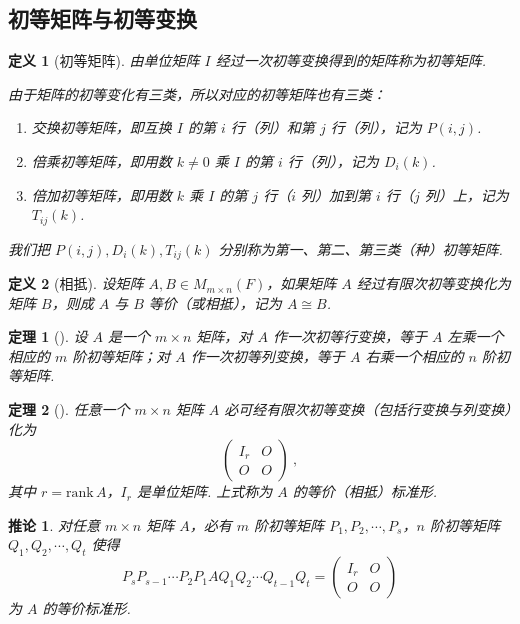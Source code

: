\documentclass[zihao=-4,UTF8,linespread=1.8,nothm]{aytony_base}
\newtheorem{theorem}{\indent 定理}[subsection]
\newtheorem*{corollary}{\indent 推论}
\newtheorem{definition}{\indent 定义}[subsection]
\begin{document}
\subsection{初等矩阵与初等变换}

\begin{definition}[初等矩阵]
    由单位矩阵 $I$ 经过一次初等变换得到的矩阵称为初等矩阵.

    由于矩阵的初等变化有三类，所以对应的初等矩阵也有三类：

    \begin{enumerate}[nosep]
        \item 交换初等矩阵，即互换 $I$ 的第 $i$ 行（列）和第 $j$ 行（列），记为 $
                  P(i,j)$.
        \item 倍乘初等矩阵，即用数 $k \neq 0$ 乘 $I$ 的第 $i$ 行（列），记为 $D_i(k)$.
        \item 倍加初等矩阵，即用数 $k$ 乘 $I$ 的第 $j$ 行（$i$ 列）加到第 $i$ 行（$j$ 列）上，记为 $T_{ij}(k)$.
    \end{enumerate}
    我们把 $P(i, j), D_i(k), T_{ij}(k)$ 分别称为第一、第二、第三类（种）初等矩阵.
\end{definition}

\begin{definition}[相抵]
    设矩阵 $A, B \in M_{m \times n}(F)$，如果矩阵 $A$ 经过有限次初等变换化为矩阵 $B$，则成 $A$ 与 $B$ 等价（或相抵），记为 $A \cong B$.
\end{definition}

\begin{theorem}[]
    设 $A$ 是一个 $m \times n$ 矩阵，对 $A$ 作一次初等行变换，等于 $A$ 左乘一个相应的 $m$ 阶初等矩阵；对 $A$ 作一次初等列变换，等于 $A$ 右乘一个相应的 $n$ 阶初等矩阵.
\end{theorem}

\begin{theorem}[]
    任意一个 $m \times n$ 矩阵 $A$ 必可经有限次初等变换（包括行变换与列变换）化为 $$
        \left(
        \begin{matrix}
                I_r & O \\
                O   & O
            \end{matrix}
        \right)\ ,
    $$ 其中 $r = \mathrm{rank}\,A$，$I_r$ 是单位矩阵. 上式称为 $A$ 的等价（相抵）标准形.
\end{theorem}

\begin{corollary}
    对任意 $m \times n$ 矩阵 $A$，必有 $m$ 阶初等矩阵 $P_1, P_2, \cdots, P_s$，$n$ 阶初等矩阵 $Q_1, Q_2, \cdots, Q_t$ 使得 $$
        P_sP_{s-1}\cdots P_2P_1AQ_1Q_2\cdots Q_{t-1}Q_t = \left(
        \begin{matrix}
                I_r & O \\
                O   & O
            \end{matrix}
        \right)
    $$ 为 $A$ 的等价标准形.
\end{corollary}
\end{document}
